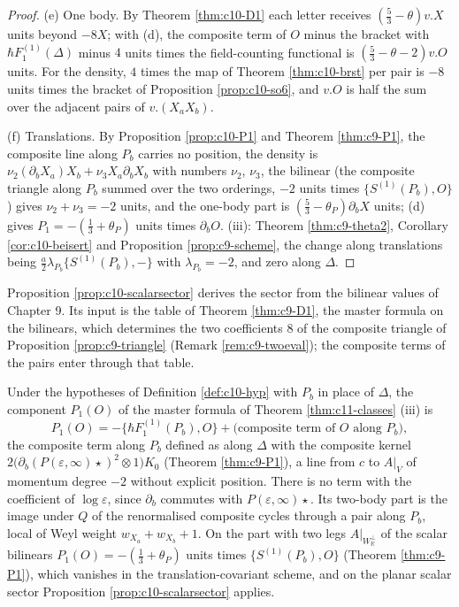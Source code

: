 \begin{proof}
(e) One body. By Theorem \ref{thm:c10-D1} each letter receives $(\tfrac53-\theta)v.X$ units beyond $-8X$; with (d), the composite term of $O$ minus the bracket with $\hbar F_1^{(1)}(\Delta)$ minus $4$ units times the field-counting functional is $(\tfrac53-\theta-2)v.O$ units. For the density, $4$ times the map of Theorem \ref{thm:c10-brst} per pair is $-8$ units times the bracket of Proposition \ref{prop:c10-so6}, and $v.O$ is half the sum over the adjacent pairs of $v.(X_aX_b)$.

(f) Translations. By Proposition \ref{prop:c10-P1} and Theorem \ref{thm:c9-P1}, the composite line along $P_b$ carries no position, the density is $\nu_2(\partial_bX_a)X_b+\nu_3X_a\partial_bX_b$ with numbers $\nu_2$, $\nu_3$, the bilinear (the composite triangle along $P_b$ summed over the two orderings, $-2$ units times $\{S^{(1)}(P_b),O\}$) gives $\nu_2+\nu_3=-2$ units, and the one-body part is $(\tfrac53-\theta_P)\partial_bX$ units; (d) gives $P_1=-(\tfrac13+\theta_P)$ units times $\partial_bO$. (iii): Theorem \ref{thm:c9-theta2}, Corollary \ref{cor:c10-beisert} and Proposition \ref{prop:c9-scheme}, the change along translations being $\tfrac a2\lambda_{P_b}\{S^{(1)}(P_b),-\}$ with $\lambda_{P_b}=-2$, and zero along $\Delta$.
\end{proof}

\begin{remark}
\label{rem:c10-inputs}
Proposition \ref{prop:c10-scalarsector} derives the sector from the bilinear values of Chapter 9. Its input is the table of Theorem \ref{thm:c9-D1}, the master formula on the bilinears, which determines the two coefficients $8$ of the composite triangle of Proposition \ref{prop:c9-triangle} (Remark \ref{rem:c9-twoeval}); the composite terms of the pairs enter through that table.
\end{remark}

\begin{proposition}
\label{prop:c10-P1}
Under the hypotheses of Definition \ref{def:c10-hyp} with $P_b$ in place of $\Delta$, the component $P_1(O)$ of the master formula of Theorem \ref{thm:c11-classes} (iii) is
\[
P_1(O)=-\big\{\hbar F_1^{(1)}(P_b),O\big\}+\big(\text{composite term of }O\text{ along }P_b\big),
\]
the composite term along $P_b$ defined as along $\Delta$ with the composite kernel $2\big(\partial_b(P(\varepsilon,\infty)\star)^2\otimes1\big)K_0$ (Theorem \ref{thm:c9-P1}), a line from $c$ to $A|_V$ of momentum degree $-2$ without explicit position. There is no term with the coefficient of $\log\varepsilon$, since $\partial_b$ commutes with $P(\varepsilon,\infty)\star$. Its two-body part is the image under $Q$ of the renormalised composite cycles through a pair along $P_b$, local of Weyl weight $w_{X_a}+w_{X_b}+1$. On the part with two legs $A|_{W_{\mathbb R}^\perp}$ of the scalar bilinears $P_1(O)=-(\tfrac13+\theta_P)$ units times $\{S^{(1)}(P_b),O\}$ (Theorem \ref{thm:c9-P1}), which vanishes in the translation-covariant scheme, and on the planar scalar sector Proposition \ref{prop:c10-scalarsector} applies.
\end{proposition}

